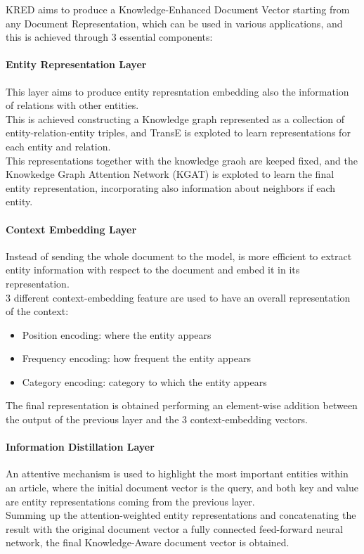 \documentclass[conference]{IEEEtran}
\begin{document}
KRED aims to produce a Knowledge-Enhanced Document Vector starting from any Document Representation, which can be used in various applications, and this is achieved through 3 essential components:
\paragraph{Entity Representation Layer}
This layer aims to produce entity represntation embedding also the information of relations with other entities.\\
This is achieved constructing a Knowledge graph represented as a collection of entity-relation-entity triples, and TransE is exploted to learn representations for each entity and relation.\\
This representations together with the knowledge graoh are keeped fixed, and the Knowkedge Graph Attention Network (KGAT) is exploted to learn the final entity representation, incorporating also information about neighbors if each entity.


\paragraph{Context Embedding Layer}
Instead of sending the whole document to the model, is more efficient to extract entity information with respect to the document and embed it in its representation.\\
3 different context-embedding feature are used to have an overall representation of the context:
\begin{itemize}
    \item Position encoding: where the entity appears
    \item Frequency encoding: how frequent the entity appears
    \item Category encoding: category to which the entity appears
\end{itemize}
The final representation is obtained performing an element-wise addition between the output of the previous layer and the 3 context-embedding vectors.

\paragraph{Information Distillation Layer}
An attentive mechanism is used to highlight the most important entities within an article, where the initial document vector is the query, and both key and value are entity representations coming from the previous layer.\\
Summing up the attention-weighted entity representations and concatenating the result with the original document vector a fully connected feed-forward neural network, the final Knowledge-Aware document vector is obtained.
\end{document}
